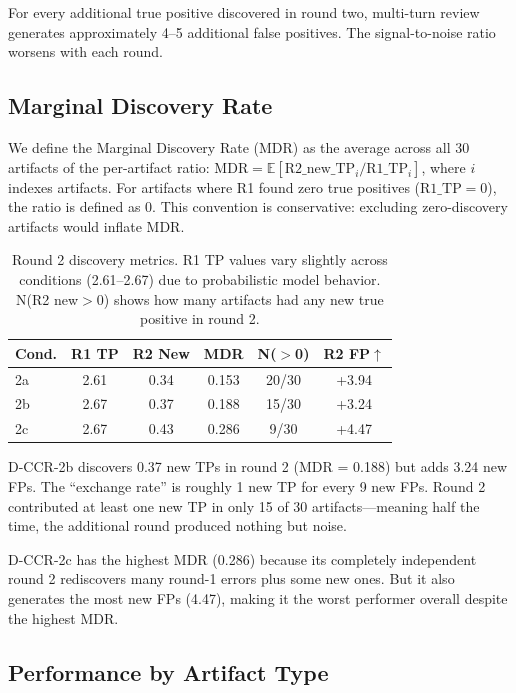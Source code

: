 \documentclass[11pt]{article}
\begin{document}
For every additional true positive discovered in round two, multi-turn review generates approximately 4--5 additional false positives. The signal-to-noise ratio worsens with each round.

\subsection{Marginal Discovery Rate}

We define the Marginal Discovery Rate (MDR) as the average across all 30 artifacts of the per-artifact ratio: $\text{MDR} = \mathbb{E}[\text{R2\_new\_TP}_i / \text{R1\_TP}_i]$, where $i$ indexes artifacts.
For artifacts where R1 found zero true positives ($\text{R1\_TP} = 0$), the ratio is defined as 0.
This convention is conservative: excluding zero-discovery artifacts would inflate MDR.

\begin{table}[t]
\centering
\caption{Round 2 discovery metrics.
R1 TP values vary slightly across conditions (2.61--2.67) due to probabilistic model behavior.
N(R2 new${>}$0) shows how many artifacts had any new true positive in round 2.}
\label{tab:mdr}
\small
\begin{tabular}{lccccc}
\toprule
\textbf{Cond.} & \textbf{R1 TP} & \textbf{R2 New} & \textbf{MDR} & \textbf{N(${>}$0)} & \textbf{R2 FP$\uparrow$} \\
\midrule
2a & 2.61 & 0.34 & 0.153 & 20/30 & +3.94 \\
2b & 2.67 & 0.37 & 0.188 & 15/30 & +3.24 \\
2c & 2.67 & 0.43 & 0.286 & 9/30 & +4.47 \\
\bottomrule
\end{tabular}
\end{table}

D-CCR-2b discovers 0.37 new TPs in round 2 (MDR = 0.188) but adds 3.24 new FPs.
The ``exchange rate'' is roughly 1 new TP for every 9 new FPs.
Round 2 contributed at least one new TP in only 15 of 30 artifacts---meaning half the time, the additional round produced nothing but noise.

D-CCR-2c has the highest MDR (0.286) because its completely independent round 2 rediscovers many round-1 errors plus some new ones.
But it also generates the most new FPs (4.47), making it the worst performer overall despite the highest MDR.

\subsection{Performance by Artifact Type}
\end{document}
